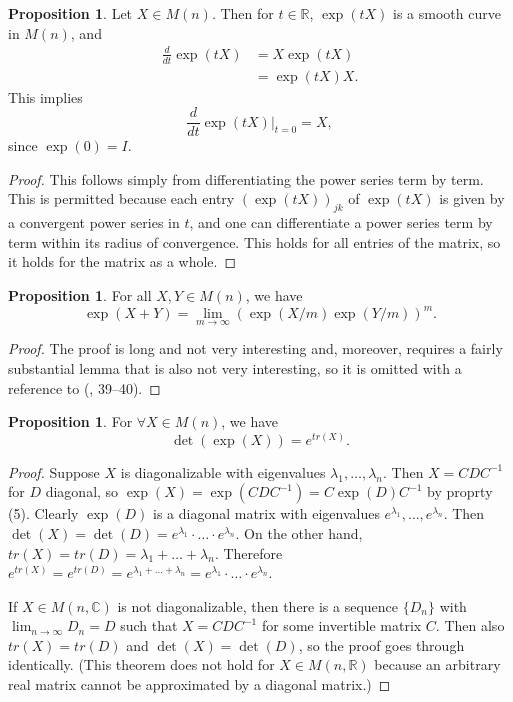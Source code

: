 \documentclass[12pt]{article}
\newcommand{\C}{\mathbb{C}}
\newcommand{\R}{\mathbb{R}}
\theoremstyle{definition}
\newtheorem{prop}[them]{Proposition}
\theoremstyle{definition}
\theoremstyle{definition}
\theoremstyle{definition}
\theoremstyle{definition}
\theoremstyle{definition}
\theoremstyle{definition}
\theoremstyle{definition}
\begin{document}
\begin{prop} Let $X \in M(n)$. Then for $t \in \R$,
$\exp(tX)$ is a smooth curve in
$M(n)$, and 
\[\begin{aligned}
    \frac{d}{dt} \exp(tX) & = X\exp(tX) \\ & = \exp(tX)X.
\end{aligned}\] This implies
\[
    \frac{d}{dt} \exp(tX) \Big|_{t=0} = X,
\] since $\exp(0) = I$.
\end{prop}

\begin{proof} This follows simply from
differentiating the power series term by term.
This is permitted because each entry
${(\exp(tX))}_{jk}$ of $\exp(tX)$ is given by a
convergent power series in $t$, and one can
differentiate a power series term by term within
its radius of convergence. This holds for all
entries of the matrix, so it holds for the matrix
as a whole.
\end{proof}

\begin{prop}\label{prop:weirdexp}
    For all $X, Y \in M(n)$, we have
\[
    \exp(X+Y) = \lim_{m\to\infty} {(\exp(X/m)\exp(Y/m))}^m.
\]
\end{prop}

\begin{proof}
    The proof is long and not very interesting
    and, moreover, requires a fairly substantial
    lemma that is also not very interesting,
    so it is omitted with a reference to
    (\cite{Hall}, 39--40).
\end{proof}

\begin{prop} For $\forall X \in M(n)$, we have 
\[
    \det(\exp(X)) = e^{tr(X)}.
\]
\end{prop}

\begin{proof}
\par{Suppose $X$ is diagonalizable with
eigenvalues $\lambda_1, \hdots, \lambda_n$. Then
$X = CDC^{-1}$ for $D$ diagonal, so $\exp(X) =
\exp(CDC^{-1}) = C\exp(D)C^{-1}$ by proprty (5). Clearly
$\exp(D)$ is a diagonal matrix with eigenvalues
$e^{\lambda_1}, \hdots, e^{\lambda_n}$. Then
$\det(X) = \det(D) = e^{\lambda_1}\cdot \hdots
\cdot e^{\lambda_n}$. On the other hand, $tr(X) =
tr(D) = \lambda_1 + \hdots + \lambda_n$. Therefore
$e^{tr(X)} = e^{tr(D)} = e^{\lambda_1 + \hdots +
\lambda_n} = e^{\lambda_1} \cdot \hdots \cdot
e^{\lambda_n}$.}


\par{If $X \in M(n, \C)$ is not diagonalizable,
then there is a sequence $\{D_n\}$ with
$\lim_{n\to\infty}D_n = D$ such that $X =
CDC^{-1}$ for some invertible matrix $C$.
Then also $tr(X) = tr(D)$ and $\det(X) = \det(D)$,
so the proof goes through identically. (This theorem does not hold for $X \in M(n, \R)$
because an arbitrary real matrix cannot be
approximated by a diagonal matrix.)}
\end{proof}
\end{document}
